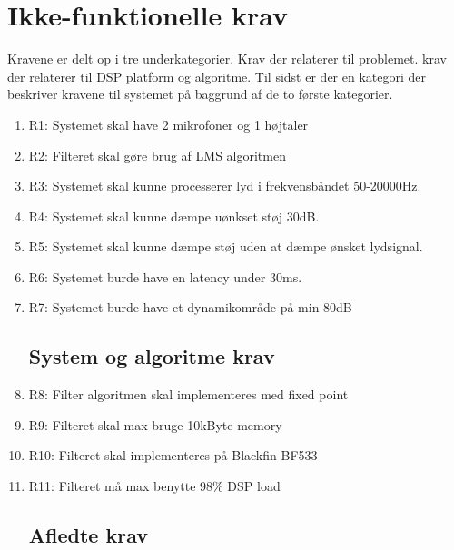 \section{Ikke-funktionelle krav}
Kravene er delt op i tre underkategorier. Krav der relaterer til problemet. krav der relaterer til DSP platform og algoritme. Til sidst er der en kategori der beskriver kravene til systemet på baggrund af de to første kategorier.
\begin{enumerate}
	
	\subsection{Problemrelateret krav}
	\item R1: Systemet skal have 2 mikrofoner og 1 højtaler
	
	\item R2: Filteret skal gøre brug af LMS algoritmen
	
	\item R3: Systemet skal kunne processerer lyd i frekvensbåndet 50-20000Hz. 
	
	\item R4: Systemet skal kunne dæmpe uønkset støj 30dB.
	
	\item R5: Systemet skal kunne dæmpe støj uden at dæmpe ønsket lydsignal.
	
	\item R6: Systemet burde have en latency under 30ms.
	
	\item R7: Systemet burde have et dynamikområde på min 80dB
	
	\subsection{System og algoritme krav}
	
	\item R8: Filter algoritmen skal implementeres med fixed point 
	
	\item R9: Filteret skal max bruge 10kByte memory
	
	\item R10: Filteret skal implementeres på Blackfin BF533
	
	\item R11: Filteret må max benytte 98\% DSP load

	\subsection{Afledte krav}
	

\end{enumerate}
